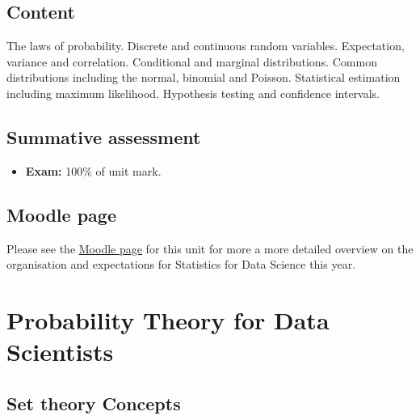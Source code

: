 \documentclass[
  letterpaper,
  DIV=11,
  numbers=noendperiod]{scrreport}
\providecommand{\tightlist}{%
  \setlength{\itemsep}{0pt}\setlength{\parskip}{0pt}}
\theoremstyle{definition}
\theoremstyle{plain}
\theoremstyle{plain}
\theoremstyle{definition}
\theoremstyle{remark}
\begin{document}
\section*{Content}\label{content}


The laws of probability. Discrete and continuous random variables.
Expectation, variance and correlation. Conditional and marginal
distributions. Common distributions including the normal, binomial and
Poisson. Statistical estimation including maximum likelihood. Hypothesis
testing and confidence intervals.

\section*{Summative assessment}\label{summative-assessment}


\begin{itemize}
\tightlist
\item
  \textbf{Exam:} 100\% of unit mark.
\end{itemize}

\section*{Moodle page}\label{moodle-page}


Please see the
\href{https://moodle.bath.ac.uk/course/view.php?id=62904}{Moodle page}
for this unit for more a more detailed overview on the organisation and
expectations for Statistics for Data Science this year.


\chapter{Probability Theory for Data
Scientists}\label{probability-theory-for-data-scientists}

\section{Set theory Concepts}\label{set-theory-concepts}
\end{document}
